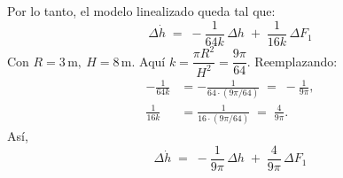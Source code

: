 \documentclass[
  11pt,
  letterpaper,
   addpoints,
   answers
  ]{exam}
\begin{document}
\begin{questions}
\begin{solution}
Por lo tanto, el modelo linealizado queda tal que:
\begin{equation}
    \boxed{\,\Delta \dot h \;=\; -\frac{1}{64k}\,\Delta h \;+\; \frac{1}{16k}\,\Delta F_1\,}
\end{equation}
Con $R=3\,\mathrm{m},\ H=8\,\mathrm{m}$. Aquí $k=\dfrac{\pi R^2}{H^2}=\dfrac{9\pi}{64}$. Reemplazando:
\begin{align}
    -\frac{1}{64k} &= -\frac{1}{64\cdot (9\pi/64)} \;=\; -\frac{1}{9\pi},\\
     \frac{1}{16k} &= \frac{1}{16\cdot (9\pi/64)} \;=\; \frac{4}{9\pi}.
\end{align}
Así,
\begin{equation}
    \boxed{\,\Delta \dot h \;=\; -\frac{1}{9\pi}\,\Delta h \;+\; \frac{4}{9\pi}\,\Delta F_1\,}
\end{equation}


\end{solution}
\end{questions}
\end{document}
